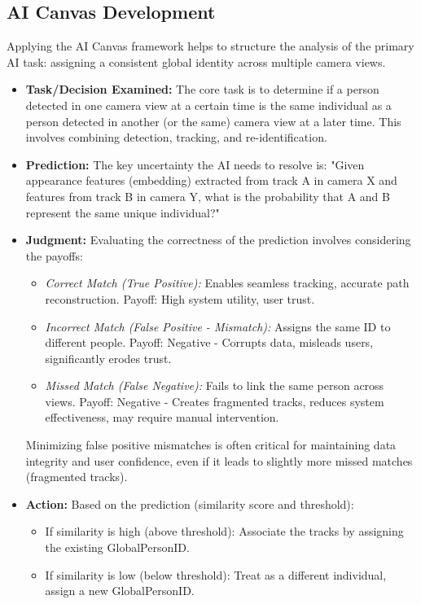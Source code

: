 \subsection{AI Canvas Development}
\label{subsection:ai_canvas_dev} %
Applying the AI Canvas framework helps to structure the analysis of the primary AI task: assigning a consistent global identity across multiple camera views.
\begin{itemize}
    \item \textbf{Task/Decision Examined:} The core task is to determine if a person detected in one camera view at a certain time is the same individual as a person detected in another (or the same) camera view at a later time. This involves combining detection, tracking, and re-identification.
    \item \textbf{Prediction:} The key uncertainty the AI needs to resolve is: "Given appearance features (embedding) extracted from track A in camera X and features from track B in camera Y, what is the probability that A and B represent the same unique individual?"

    \item \textbf{Judgment:} Evaluating the correctness of the prediction involves considering the payoffs:
        \begin{itemize}
            \item \textit{Correct Match (True Positive):} Enables seamless tracking, accurate path reconstruction. Payoff: High system utility, user trust.
            \item \textit{Incorrect Match (False Positive - Mismatch):} Assigns the same ID to different people. Payoff: Negative - Corrupts data, misleads users, significantly erodes trust.
            \item \textit{Missed Match (False Negative):} Fails to link the same person across views. Payoff: Negative - Creates fragmented tracks, reduces system effectiveness, may require manual intervention.
        \end{itemize}
        Minimizing false positive mismatches is often critical for maintaining data integrity and user confidence, even if it leads to slightly more missed matches (fragmented tracks).

    \item \textbf{Action:} Based on the prediction (similarity score and threshold):
        \begin{itemize}
            \item If similarity is high (above threshold): Associate the tracks by assigning the existing GlobalPersonID.
            \item If similarity is low (below threshold): Treat as a different individual, assign a new GlobalPersonID.
        \end{itemize}


\end{itemize}
